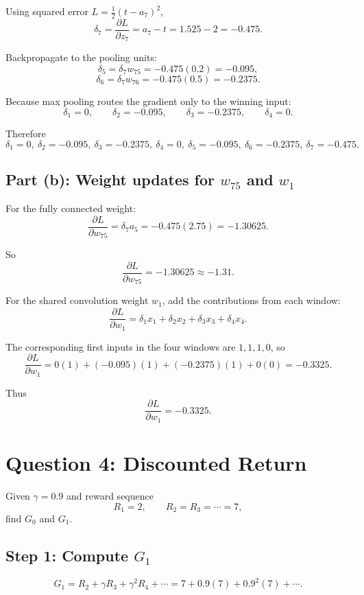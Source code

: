 \documentclass[11pt]{article}
\begin{document}
Using squared error \(L=\tfrac12(t-a_7)^2\),
\[
    \delta_7 = \frac{\partial L}{\partial z_7}
    = a_7 - t = 1.525 - 2 = -0.475.
\]

Backpropagate to the pooling units:
\[
    \delta_5 = \delta_7 w_{75} = -0.475(0.2) = -0.095,
\]
\[
    \delta_6 = \delta_7 w_{76} = -0.475(0.5) = -0.2375.
\]

Because max pooling routes the gradient only to the winning input:
\[
    \delta_1 = 0,\qquad
    \delta_2 = -0.095,\qquad
    \delta_3 = -0.2375,\qquad
    \delta_4 = 0.
\]

Therefore
\[
    \boxed{
    \delta_1=0,\ 
    \delta_2=-0.095,\ 
    \delta_3=-0.2375,\ 
    \delta_4=0,\ 
    \delta_5=-0.095,\ 
    \delta_6=-0.2375,\ 
    \delta_7=-0.475
    }.
\]

\subsection*{Part (b): Weight updates for \(w_{75}\) and \(w_1\)}

For the fully connected weight:
\[
    \frac{\partial L}{\partial w_{75}}
    = \delta_7 a_5
    = -0.475(2.75)
    = -1.30625.
\]

So
\[
    \boxed{\frac{\partial L}{\partial w_{75}}=-1.30625\approx -1.31.}
\]

For the shared convolution weight \(w_1\), add the contributions from each
window:
\[
    \frac{\partial L}{\partial w_1}
    =
    \delta_1 x_1 + \delta_2 x_2 + \delta_3 x_3 + \delta_4 x_4.
\]

The corresponding first inputs in the four windows are \(1,1,1,0\), so
\[
    \frac{\partial L}{\partial w_1}
    =
    0(1) + (-0.095)(1) + (-0.2375)(1) + 0(0)
    = -0.3325.
\]

Thus
\[
    \boxed{\frac{\partial L}{\partial w_1}=-0.3325.}
\]

\section*{Question 4: Discounted Return}

Given \(\gamma=0.9\) and reward sequence
\[
    R_1 = 2,\qquad R_2=R_3=\cdots = 7,
\]
find \(G_0\) and \(G_1\).

\subsection*{Step 1: Compute \(G_1\)}

\[
    G_1 = R_2 + \gamma R_3 + \gamma^2 R_4 + \cdots
    = 7 + 0.9(7) + 0.9^2(7) + \cdots.
\]
\end{document}
